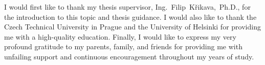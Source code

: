 I would first like to thank my thesis supervisor, Ing.~Filip~Křikava,~Ph.D.,
for the introduction to this topic and thesis guidance.
I would also like to thank the Czech Technical University in Prague and
the University of Helsinki for providing me with a high-quality education.
Finally, I would like to express my very profound gratitude to my parents, family, and friends
for providing me with unfailing support and continuous encouragement throughout my years of study.
